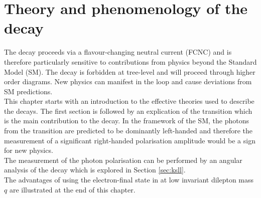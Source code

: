 \chapter{Theory and phenomenology of the \BdKstee decay}
\label{chapter1}
The \BdKstee decay proceeds via a flavour-changing neutral current (FCNC) and is therefore particularly sensitive to contributions from physics beyond the Standard Model (SM). The decay is forbidden at tree-level and will proceed through higher order diagrams. New physics can manifest in the loop and cause deviations from SM predictions.\\
This chapter starts with an introduction to the effective theories used to describe the \BdKstll decays. The first section is followed by an explication of the \bsg transition which is the main contribution to the \BdKstee decay. In the framework of the SM, the photons from the \bsg transition are predicted to be dominantly left-handed and therefore the measurement of a significant right-handed polarisation amplitude would be a sign for new physics.\\
The measurement of the photon polarisation can be performed by an angular analysis of the \BdKstll decay which is explored in Section \ref{sec:ksll}.\\
The advantages of using the electron-final state in \BdKstee at low invariant dilepton mass $q$ are illustrated at the end of this chapter.


